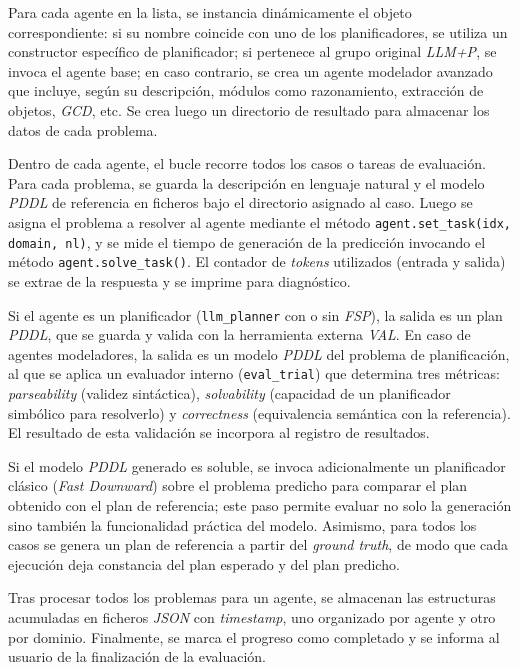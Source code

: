Para cada agente en la lista, se instancia dinámicamente el objeto correspondiente: si su nombre coincide con uno de los planificadores, se utiliza un constructor específico de planificador; si pertenece al grupo original \textit{LLM+P}, se invoca el agente base; en caso contrario, se crea un agente modelador avanzado que incluye, según su descripción, módulos como razonamiento, extracción de objetos, \textit{GCD}, etc. Se crea luego un directorio de resultado para almacenar los datos de cada problema.

Dentro de cada agente, el bucle recorre todos los casos o tareas de evaluación. Para cada problema, se guarda la descripción en lenguaje natural y el modelo \textit{PDDL} de referencia en ficheros bajo el directorio asignado al caso. Luego se asigna el problema a resolver al agente mediante el método \texttt{agent.set\_task(idx, domain, nl)}, y se mide el tiempo de generación de la predicción invocando el método \texttt{agent.solve\_task()}. El contador de \textit{tokens} utilizados (entrada y salida) se extrae de la respuesta y se imprime para diagnóstico.

Si el agente es un planificador (\texttt{llm\_planner} con o sin \textit{FSP}), la salida es un plan \textit{PDDL}, que se guarda y valida con la herramienta externa \textit{VAL}. En caso de agentes modeladores, la salida es un modelo \textit{PDDL} del problema de planificación, al que se aplica un evaluador interno (\texttt{eval\_trial}) que determina tres métricas: \textit{parseability} (validez sintáctica), \textit{solvability} (capacidad de un planificador simbólico para resolverlo) y \textit{correctness} (equivalencia semántica con la referencia). El resultado de esta validación se incorpora al registro de resultados.

Si el modelo \textit{PDDL} generado es soluble, se invoca adicionalmente un planificador clásico (\textit{Fast Downward}) sobre el problema predicho para comparar el plan obtenido con el plan de referencia; este paso permite evaluar no solo la generación sino también la funcionalidad práctica del modelo. Asimismo, para todos los casos se genera un plan de referencia a partir del \textit{ground truth}, de modo que cada ejecución deja constancia del plan esperado y del plan predicho.

Tras procesar todos los problemas para un agente, se almacenan las estructuras acumuladas en ficheros \textit{JSON} con \textit{timestamp}, uno organizado por agente y otro por dominio. Finalmente, se marca el progreso como completado y se informa al usuario de la finalización de la evaluación.

